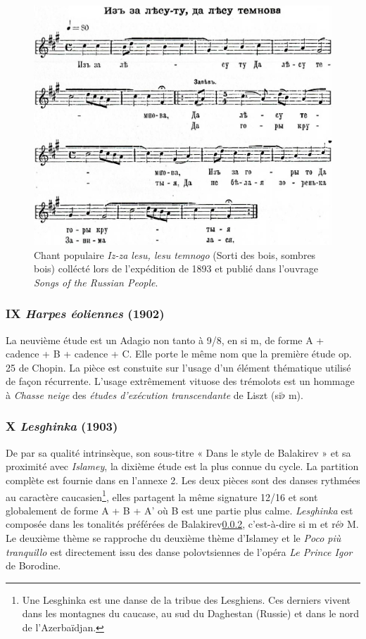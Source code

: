 \begin{figure}[!ht]
  \begin{bigcenter}
    \includegraphics[width=15.0cm, keepaspectratio]{woods.png}
  \end{bigcenter}
  \caption{\label{woods}Chant populaire \emph{Iz-za lesu, lesu temnogo} (Sorti des bois, sombres bois) collécté lors de l'expédition de 1893 et publié dans l'ouvrage \emph{Songs of the Russian People}.}
\end{figure}

\subsubsection{IX \emph{Harpes éoliennes} (1902)}

La neuvième étude est un Adagio non tanto à 9/8, en si m, de forme A + cadence + B + cadence + C. Elle porte le même nom que la première étude op. 25 de Chopin. La pièce est constuite sur l'usage d'un élément thématique utilisé de façon récurrente. L'usage extrêmement vituose des trémolots est un hommage à \emph{Chasse neige} des \emph{études d'exécution transcendante} de Liszt (si$\flat$ m).

\subsubsection{X \emph{Lesghinka} (1903)}

De par sa qualité intrinsèque, son sous-titre « Dans le style de Balakirev » et sa proximité avec \emph{Islamey}, la dixième étude est la plus connue du cycle. La partition complète est fournie dans en l'annexe 2. Les deux pièces sont des danses rythmées au caractère caucasien\footnote{Une Lesghinka est une danse de la tribue des Lesghiens. Ces derniers vivent dans les montagnes du caucase, au sud du Daghestan (Russie) et dans le nord de l'Azerbaïdjan.}, elles partagent la même signature 12/16 et sont globalement de forme A + B + A' où B est une partie plus calme. \emph{Lesghinka} est composée dans les tonalités préférées de Balakirev\ref{}, c'est-à-dire si m et ré$\flat$ M. Le deuxième thème se rapproche du deuxième thème d'Islamey et le \emph{Poco pi\`{u} tranquillo} est directement issu des danse polovtsiennes de l'opéra \emph{Le Prince Igor} de Borodine.

